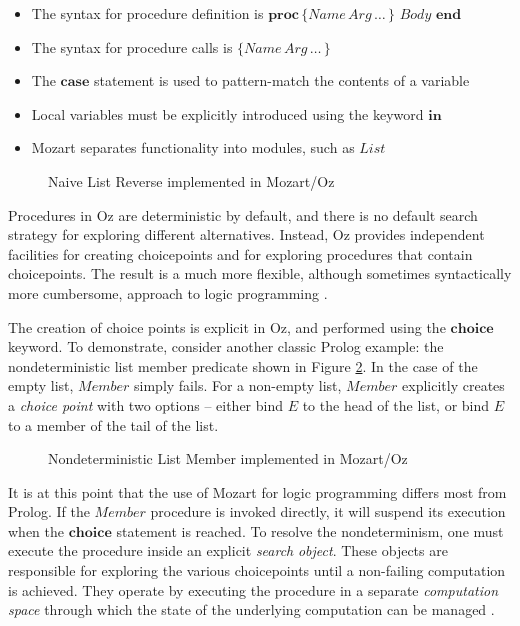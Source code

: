 \begin{itemize}
\item The syntax for procedure definition is $\mathbf{proc}\,\{Name\, Arg\,\dots\,\}\,\, Body\,\,\mathbf{end}$ 
\item The syntax for procedure calls is $\{Name\, Arg\,\dots\,\}$ 
\item The $\mathbf{case}$ statement is used to pattern-match the contents
of a variable 
\item Local variables must be explicitly introduced using the keyword $\mathbf{in}$ 
\item Mozart separates functionality into modules, such as $List$ 
\end{itemize}
%
\begin{figure}[t]

\caption{Naive List Reverse implemented in Mozart/Oz\label{fig:Background:Naive-List-Reverse}}

\end{figure}


Procedures in Oz are deterministic by default, and there is no default
search strategy for exploring different alternatives. Instead, Oz
provides independent facilities for creating choicepoints and for
exploring procedures that contain choicepoints. The result is a much
more flexible, although sometimes syntactically more cumbersome, approach
to logic programming \citep{lpinoz99}.

The creation of choice points is explicit in Oz, and performed using
the $\mathbf{choice}$ keyword. To demonstrate, consider another classic
Prolog example: the nondeterministic list member predicate shown in
Figure \ref{fig:Background:Nondet-Member}. In the case of the empty
list, $Member$ simply fails. For a non-empty list, $Member$ explicitly
creates a \emph{choice point} with two options -- either bind $E$
to the head of the list, or bind $E$ to a member of the tail of the
list.

%
\begin{figure}[t]

\caption{Nondeterministic List Member implemented in Mozart/Oz\label{fig:Background:Nondet-Member}}

\end{figure}


It is at this point that the use of Mozart for logic programming differs
most from Prolog. If the $Member$ procedure is invoked directly,
it will suspend its execution when the $\mathbf{choice}$ statement
is reached. To resolve the nondeterminism, one must execute the procedure
inside an explicit \emph{search} \emph{object}. These objects are
responsible for exploring the various choicepoints until a non-failing
computation is achieved. They operate by executing the procedure in
a separate \emph{computation space} through which the state of the
underlying computation can be managed \citep{schulte00constraint_services}.


